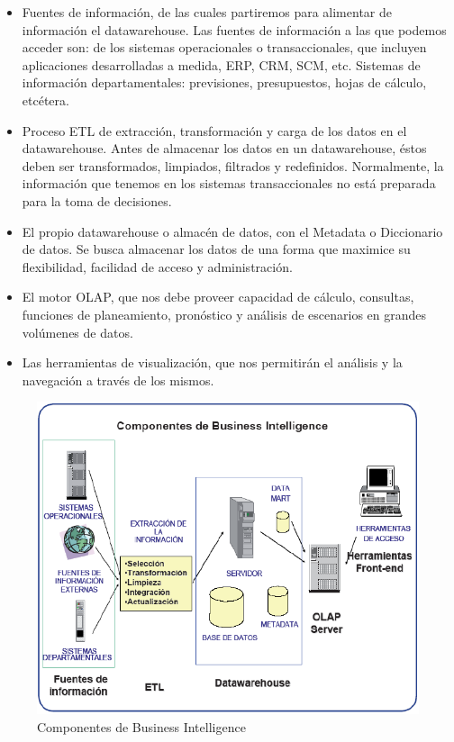 \documentclass[preprint,12pt]{elsarticle}
\begin{document}
	\begin{itemize}
	\item Fuentes de información, de las cuales partiremos para alimentar de información el datawarehouse. Las fuentes de información a las que podemos acceder son: de los sistemas operacionales o transaccionales, que incluyen aplicaciones desarrolladas a medida, ERP, CRM, SCM, etc. Sistemas de información departamentales: previsiones, presupuestos, hojas de cálculo, etcétera.
	\item Proceso ETL de extracción, transformación y carga de los datos en el datawarehouse. Antes de almacenar los datos en un datawarehouse, éstos deben ser transformados, limpiados, filtrados y redefinidos. Normalmente, la información que tenemos en los sistemas transaccionales no está preparada para la toma de decisiones.
	\item El propio datawarehouse o almacén de datos, con el Metadata o Diccionario de datos. Se busca almacenar los datos de una forma que maximice su flexibilidad, facilidad de acceso y administración.
	\item El motor OLAP, que nos debe proveer capacidad de cálculo, consultas, funciones de planeamiento, pronóstico y análisis de escenarios en grandes volúmenes de datos.
	\item Las herramientas de visualización, que nos permitirán el análisis y la navegación a través de los mismos.

	\end{itemize}

\begin{figure}[htb]
	\begin{center}
		\includegraphics[width=14cm]{./IMAGENES/componentes} 
		\caption{Componentes de Business Intelligence}
	\end{center}
\end{figure}
\end{document}
